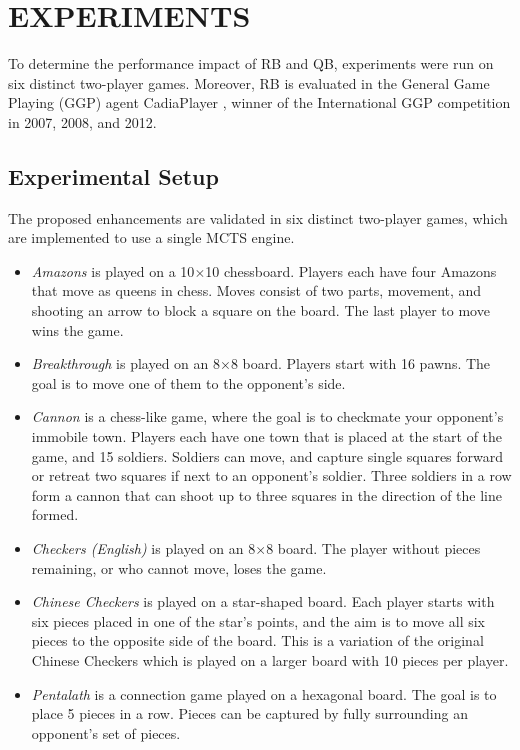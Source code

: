 \documentclass{ecai2014}
\begin{document}
\section{EXPERIMENTS}
\label{sec:experiments}
To determine the performance impact of RB and QB, experiments were run on six distinct two-player games. Moreover, RB is evaluated in the General Game Playing (GGP) agent {\sc CadiaPlayer} \cite{bjornsson2009cadiaplayer}, winner of the International GGP competition in 2007, 2008, and 2012.

\subsection{Experimental Setup}
\label{subsec:expsetup}
The proposed enhancements are validated in six distinct two-player games, which are implemented to use a single MCTS engine.

\begin{itemize}
\item \emph{Amazons} is played on a 10$\times$10 chessboard. Players each have four Amazons that move as queens in chess. Moves consist of two parts, movement, and shooting an arrow to block a square on the board. The last player to move wins the game.
\item \emph{Breakthrough} is played on an 8$\times$8 board. Players start with 16 pawns. The goal is to move one of them to the opponent's side.
\item \emph{Cannon} is a chess-like game, where the goal is to checkmate your opponent's immobile town. Players each have one town that is placed at the start of the game, and 15 soldiers. Soldiers can move, and capture single squares forward or retreat two squares if next to an opponent's soldier. Three soldiers in a row form a cannon that can shoot up to three squares in the direction of the line formed.
\item \emph{Checkers (English)} is played on an 8$\times$8 board. The player without pieces remaining, or who cannot move, loses the game.
\item \emph{Chinese Checkers} is played on a star-shaped board. Each player starts with six pieces placed in one of the star's points, and the aim is to move all six pieces to the opposite side of the board. This is a variation of the original Chinese Checkers which is played on a larger board with 10 pieces per player.
\item \emph{Pentalath} is a connection game played on a hexagonal board. The goal is to place 5 pieces in a row. Pieces can be captured by fully surrounding an opponent's set of pieces.
\end{itemize}
\end{document}
